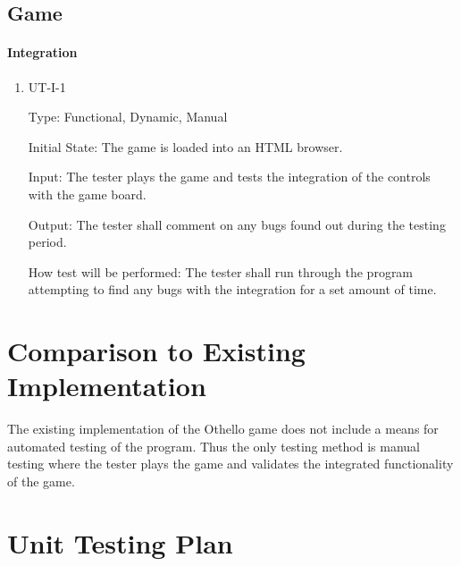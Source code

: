 \documentclass[12pt, titlepage]{article}
\begin{document}
\subsection{Game}

\paragraph{Integration}

\begin{enumerate}

	\item UT-I-1

	      Type: Functional, Dynamic, Manual

	      Initial State: The game is loaded into an HTML browser.

	      Input: The tester plays the game and tests the integration of the controls with the game board.

	      Output: The tester shall comment on any bugs found out during the testing period.

	      How test will be performed: The tester shall run through the program attempting to find any bugs with the integration for a set amount of time.

\end{enumerate}

\section{Comparison to Existing Implementation}

The existing implementation of the Othello game does not include a means for automated testing of the program. Thus the only testing method is manual testing where the tester plays the game and validates the integrated functionality of the game.

\section{Unit Testing Plan}
\end{document}
